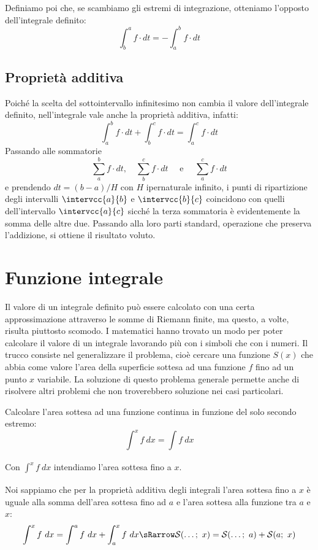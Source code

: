 Definiamo poi che, se scambiamo gli estremi di integrazione, otteniamo 
l'opposto dell'integrale definito:
\[\int_b^a f \cdot dt = - \int_a^b f \cdot dt\]

\subsection{Proprietà additiva}
\label{subsec:integrali_proprieta_additiva}

Poiché la scelta del sottointervallo infinitesimo non cambia il valore 
dell'integrale definito, 
nell'integrale vale anche la proprietà additiva, infatti: 
\[\int_a^b f \cdot dt + \int_b^c f \cdot dt = \int_a^c f \cdot 
dt\] 
Passando alle sommatorie 
\[\sum_a^b f \cdot dt,\quad \sum_b^c f \cdot dt \quad\text{ e } \quad 
  \sum_a^c f \cdot dt\] 
e prendendo 
\(dt = (b-a)/H\)
con \(H\) ipernaturale infinito, 
i punti di ripartizione degli intervalli \(\intervcc{a}{b}\) e 
\(\intervcc{b}{c}\) coincidono con quelli dell'intervallo \(\intervcc{a}{c}\)
sicché la terza sommatoria è evidentemente la somma delle altre due.
Passando alla loro parti standard, operazione che preserva l'addizione, si 
ottiene il risultato voluto.

\section{Funzione integrale}
\label{sec:integrali_funzione_integrale}

Il valore di un integrale definito può essere calcolato con una certa 
approssimazione attraverso le somme di Riemann finite, ma questo, a volte, 
risulta piuttosto scomodo. I matematici hanno trovato un modo per poter 
calcolare il valore di un integrale lavorando più con i simboli che con i 
numeri. Il trucco consiste nel generalizzare il problema, cioè cercare una 
funzione \(S(x)\) che abbia come valore l'area della superficie sottesa ad 
una funzione \(f\) fino ad un punto \(x\) variabile. La soluzione di questo 
problema generale permette anche di risolvere altri problemi che non 
troverebbero soluzione nei casi particolari.

\begin{problema}
 Calcolare l'area sottesa ad una funzione continua in funzione del solo 
secondo estremo:
\[\int_{}^x f~dx = \int f~dx\] 
\end{problema}

Con \(\int_{}^x f~dx\) intendiamo l'area sottesa fino a \(x\).

Noi sappiamo che per la proprietà additiva degli integrali l'area sottesa 
fino a \(x\) è uguale alla somma dell'area sottesa fino ad \(a\) e l'area 
sottesa alla funzione tra \(a\) e \(x\):
\[\int_{}^x f~dx = \int_{}^a f~dx + \int_{a}^x f~dx \sRarrow
  \mathcal{S}(\dots ;~x) = \mathcal{S}(\dots ;~a) + \mathcal{S}(a;~x)\]

